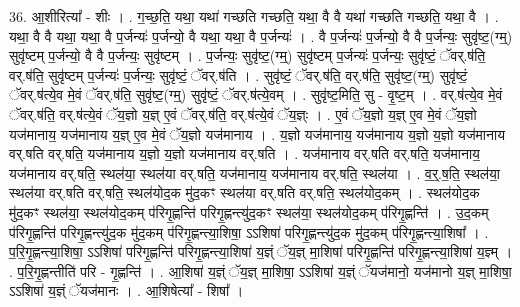 \documentclass[17pt]{extarticle}
\begin{document}
36. आ॒शीरित्या᳚ - शीः । . ग॒च्छ॒ति॒ यथा॒ यथा॑ गच्छति गच्छति॒ यथा॒ वै वै यथा॑ गच्छति गच्छति॒ यथा॒ वै । . यथा॒ वै वै यथा॒ यथा॒ वै प॒र्जन्यः॑ प॒र्जन्यो॒ वै यथा॒ यथा॒ वै प॒र्जन्यः॑ । . वै प॒र्जन्यः॑ प॒र्जन्यो॒ वै वै प॒र्जन्यः॒ सुवृ॑ष्ट॒(ग्म्॒) सुवृ॑ष्टम् प॒र्जन्यो॒ वै वै प॒र्जन्यः॒ सुवृ॑ष्टम् । . प॒र्जन्यः॒ सुवृ॑ष्ट॒(ग्म्॒) सुवृ॑ष्टम् प॒र्जन्यः॑ प॒र्जन्यः॒ सुवृ॑ष्टं॒ ॅवर्.ष॑ति॒ वर्.ष॑ति॒ सुवृ॑ष्टम् प॒र्जन्यः॑ प॒र्जन्यः॒ सुवृ॑ष्टं॒ ॅवर्.ष॑ति । . सुवृ॑ष्टं॒ ॅवर्.ष॑ति॒ वर्.ष॑ति॒ सुवृ॑ष्ट॒(ग्म्॒) सुवृ॑ष्टं॒ ॅवर्.ष॑त्ये॒व मे॒वं ॅवर्.ष॑ति॒ सुवृ॑ष्ट॒(ग्म्॒) सुवृ॑ष्टं॒ ॅवर्.ष॑त्ये॒वम् । . सुवृ॑ष्ट॒मिति॒ सु - वृ॒ष्ट॒म् । . वर्.ष॑त्ये॒व मे॒वं ॅवर्.ष॑ति॒ वर्.ष॑त्ये॒वं ॅय॒ज्ञो य॒ज्ञ् ए॒वं ॅवर्.ष॑ति॒ वर्.ष॑त्ये॒वं ॅय॒ज्ञ्ः । . ए॒वं ॅय॒ज्ञो य॒ज्ञ् ए॒व मे॒वं ॅय॒ज्ञो यज॑मानाय॒ यज॑मानाय य॒ज्ञ् ए॒व मे॒वं ॅय॒ज्ञो यज॑मानाय । . य॒ज्ञो यज॑मानाय॒ यज॑मानाय य॒ज्ञो य॒ज्ञो यज॑मानाय वर्.षति वर्.षति॒ यज॑मानाय य॒ज्ञो य॒ज्ञो यज॑मानाय वर्.षति । . यज॑मानाय वर्.षति वर्.षति॒ यज॑मानाय॒ यज॑मानाय वर्.षति॒ स्थल॑या॒ स्थल॑या वर्.षति॒ यज॑मानाय॒ यज॑मानाय वर्.षति॒ स्थल॑या । . व॒र्॒.ष॒ति॒ स्थल॑या॒ स्थल॑या वर्.षति वर्.षति॒ स्थल॑योद॒क मु॑द॒कꣳ स्थल॑या वर्.षति वर्.षति॒ स्थल॑योद॒कम् । . स्थल॑योद॒क मु॑द॒कꣳ स्थल॑या॒ स्थल॑योद॒कम् प॑रिगृ॒ह्णन्ति॑ परिगृ॒ह्णन्त्यु॑द॒कꣳ स्थल॑या॒ स्थल॑योद॒कम् प॑रिगृ॒ह्णन्ति॑ । . उ॒द॒कम् प॑रिगृ॒ह्णन्ति॑ परिगृ॒ह्णन्त्यु॑द॒क मु॑द॒कम् प॑रिगृ॒ह्णन्त्या॒शिषा॒ ऽऽशिषा॑ परिगृ॒ह्णन्त्यु॑द॒क मु॑द॒कम् प॑रिगृ॒ह्णन्त्या॒शिषा᳚ । . प॒रि॒गृ॒ह्णन्त्या॒शिषा॒ ऽऽशिषा॑ परिगृ॒ह्णन्ति॑ परिगृ॒ह्णन्त्या॒शिषा॑ य॒ज्ञ्ं ॅय॒ज्ञ् मा॒शिषा॑ परिगृ॒ह्णन्ति॑ परिगृ॒ह्णन्त्या॒शिषा॑ य॒ज्ञ्म् । . प॒रि॒गृ॒ह्णन्तीति॑ परि - गृ॒ह्णन्ति॑ । . आ॒शिषा॑ य॒ज्ञ्ं ॅय॒ज्ञ् मा॒शिषा॒ ऽऽशिषा॑ य॒ज्ञ्ं ॅयज॑मानो॒ यज॑मानो य॒ज्ञ् मा॒शिषा॒ ऽऽशिषा॑ य॒ज्ञ्ं ॅयज॑मानः । . आ॒शिषेत्या᳚ - शिषा᳚ । \newline
\end{document}
